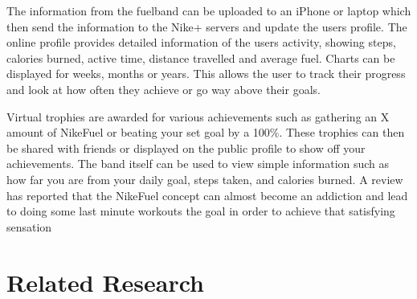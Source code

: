 The information from the fuelband can be uploaded to an iPhone or laptop which then send the information to the Nike+ servers and update the users profile. The online profile provides detailed information of the users activity, showing steps, calories burned, active time, distance travelled and average fuel. Charts can be displayed for weeks, months or years. This allows the user to track their progress and look at how often they achieve or go way above their goals.\cite{fuelbandTechSpce} 

Virtual trophies are awarded for various achievements such as gathering an X amount of NikeFuel or beating your set goal by a 100\%. These trophies can then be shared with friends or displayed on the public profile to show off your achievements. The band itself can be used to view simple information such as how far you are from your daily goal, steps taken, and calories burned. A review has reported that the NikeFuel concept can almost become an addiction and lead to doing some last minute workouts the goal in order to achieve that satisfying sensation \cite{fuelbandDcRain}



\section{Related Research}

